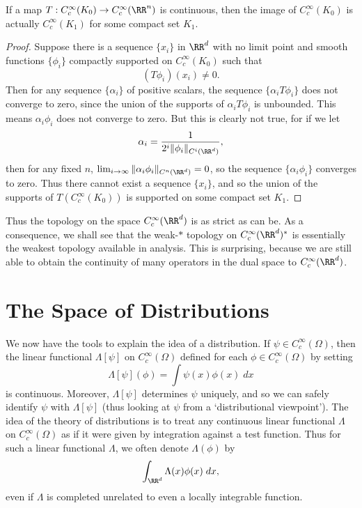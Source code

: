 \begin{theorem}
    If a map $T: C_c^\infty(K_0) \to C_c^\infty(\RR^n)$ is continuous, then the image of $C_c^\infty(K_0)$ is actually $C_c^\infty(K_1)$ for some compact set $K_1$.
\end{theorem}
\begin{proof}
    Suppose there is a sequence $\{ x_i \}$ in $\RR^d$ with no limit point and smooth functions $\{ \phi_i \}$ compactly supported on $C_c^\infty(K_0)$ such that
    \[ (T\phi_i)(x_i) \neq 0. \]
    Then for any sequence $\{ \alpha_i \}$ of positive scalars, the sequence $\{ \alpha_i T\phi_i \}$ does not converge to zero, since the union of the supports of $\alpha_i T\phi_i$ is unbounded. This means $\alpha_i \phi_i$ does not converge to zero. But this is clearly not true, for if we let
    \[ \alpha_i = \frac{1}{2^i \| \phi_i \|_{C^i(\RR^d)}}, \]
    then for any fixed $n$, $\lim_{i \to \infty} \| \alpha_i \phi_i \|_{C^n(\RR^d)} = 0$, so the sequence $\{ \alpha_i \phi_i \}$ converges to zero. Thus there cannot exist a sequence $\{ x_i \}$, and so the union of the supports of $T(C_c^\infty(K_0))$ is supported on some compact set $K_1$.
\end{proof}

Thus the topology on the space $C_c^\infty(\RR^d)$ is as strict as can be. As a consequence, we shall see that the weak-$*$ topology on $C_c^\infty(\RR^d)^*$ is essentially the weakest topology available in analysis. This is surprising, because we are still able to obtain the continuity of many operators in the dual space to $C_c^\infty(\RR^d)$.

\section{The Space of Distributions}

We now have the tools to explain the idea of a distribution. If $\psi \in C_c^\infty(\Omega)$, then the linear functional $\Lambda[\psi]$ on $C_c^\infty(\Omega)$ defined for each $\phi \in C_c^\infty(\Omega)$ by setting
%
\[ \Lambda[\psi](\phi) = \int \psi(x) \phi(x)\; dx \]
%
is continuous. Moreover, $\Lambda[\psi]$ determines $\psi$ uniquely, and so we can safely identify $\psi$ with $\Lambda[\psi]$ (thus looking at $\psi$ from a `distributional viewpoint'). The idea of the theory of distributions is to treat any continuous linear functional $\Lambda$ on $C_c^\infty(\Omega)$ as if it were given by integration against a test function. Thus for such a linear functional $\Lambda$, we often denote $\Lambda(\phi)$ by
%
\[ \int_{\RR^d} \Lambda(x) \phi(x)\; dx, \]
%
even if $\Lambda$ is completed unrelated to even a locally integrable function.

